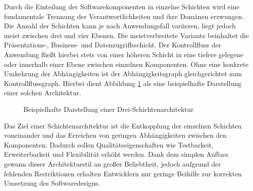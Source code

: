 Durch die Einteilung der Softwarekomponenten in einzelne Schichten wird eine fundamentale Trennung der Verantwortlichkeiten und ihre Domänen erzwungen. Die Anzahl der Schichten kann je nach Anwendungsfall variieren, liegt jedoch meist zwischen drei und vier Ebenen. Die meistverbreitete Variante beinhaltet die Präsentations-, Business- und Datenzugriffsschicht. Der Kontrollfluss der Anwendung fließt hierbei stets von einer höheren Schicht in eine tiefere gelegene oder innerhalb einer Ebene zwischen einzelnen Komponenten. Ohne eine konkrete Umkehrung der Abhängigkeiten ist der Abhängigkeitsgraph gleichgerichtet zum Kontrollflussgraph. Hierbei dient Abbildung \ref{fig:Schichtenarchitektur} als eine beispielhafte Darstellung einer solchen Architektur. 

\begin{figure}[htbp]
	\centering
	\large
	
	\caption{Beispielhafte Darstellung einer Drei-Schichtenarchitektur}
	\label{fig:Schichtenarchitektur}
\end{figure}

Das Ziel einer Schichtenarchitektur ist die Entkopplung der einzelnen Schichten voneinander und das Erreichen von geringen Abhängigkeiten zwischen den Komponenten. Dadurch sollen Qualitätseigenschaften wie Testbarkeit, Erweiterbarkeit und Flexibilität erhöht werden. Dank dem simplen Aufbau gewann dieser Architekturstil an großer Beliebtheit, jedoch aufgrund der fehlenden Restriktionen erhalten Entwicklern nur geringe Beihilfe zur korrekten Umsetzung des Softwaredesigns. 

